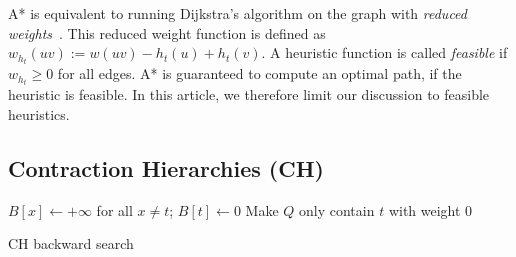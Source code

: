 \documentclass[manuscript,review]{acmart}
\begin{document}
A* is equivalent to running Dijkstra's algorithm on the graph with \emph{reduced weights}~\cite{hnr-afbhd-68}.
This reduced weight function is defined as $w_{h_t}(uv) := w(uv) - h_t(u) + h_t(v)$.
A heuristic function is called \emph{feasible} if $w_{h_t} \geq 0$ for all edges.
A* is guaranteed to compute an optimal path, if the heuristic is feasible.
In this article, we therefore limit our discussion to feasible heuristics.

\subsection{Contraction Hierarchies (CH)}

\begin{algorithm2e}
$B[x] \leftarrow +\infty$ for all $x\neq t$;
$B[t] \leftarrow 0$\;
Make $Q$ only contain $t$ with weight $0$\;
\caption{CH backward search}
\label{algo:ch-backward}
\end{algorithm2e}
\end{document}
